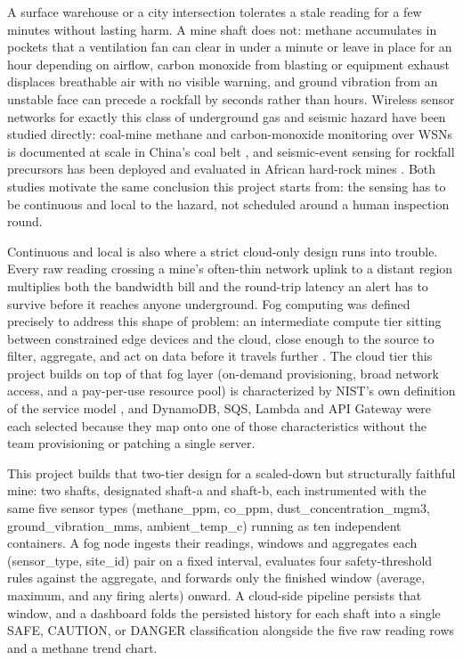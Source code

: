 \documentclass[conference]{IEEEtran}
\begin{document}
A surface warehouse or a city intersection tolerates a stale reading for a few minutes without lasting harm. A mine shaft does not: methane accumulates in pockets that a ventilation fan can clear in under a minute or leave in place for an hour depending on airflow, carbon monoxide from blasting or equipment exhaust displaces breathable air with no visible warning, and ground vibration from an unstable face can precede a rockfall by seconds rather than hours. Wireless sensor networks for exactly this class of underground gas and seismic hazard have been studied directly: coal-mine methane and carbon-monoxide monitoring over WSNs is documented at scale in China's coal belt \cite{ref1}, and seismic-event sensing for rockfall precursors has been deployed and evaluated in African hard-rock mines \cite{ref2}. Both studies motivate the same conclusion this project starts from: the sensing has to be continuous and local to the hazard, not scheduled around a human inspection round.

Continuous and local is also where a strict cloud-only design runs into trouble. Every raw reading crossing a mine's often-thin network uplink to a distant region multiplies both the bandwidth bill and the round-trip latency an alert has to survive before it reaches anyone underground. Fog computing was defined precisely to address this shape of problem: an intermediate compute tier sitting between constrained edge devices and the cloud, close enough to the source to filter, aggregate, and act on data before it travels further \cite{ref3}. The cloud tier this project builds on top of that fog layer (on-demand provisioning, broad network access, and a pay-per-use resource pool) is characterized by NIST's own definition of the service model \cite{ref4}, and DynamoDB, SQS, Lambda and API Gateway were each selected because they map onto one of those characteristics without the team provisioning or patching a single server.

This project builds that two-tier design for a scaled-down but structurally faithful mine: two shafts, designated shaft-a and shaft-b, each instrumented with the same five sensor types (methane\_ppm, co\_ppm, dust\_concentration\_mgm3, ground\_vibration\_mms, ambient\_temp\_c) running as ten independent containers. A fog node ingests their readings, windows and aggregates each (sensor\_type, site\_id) pair on a fixed interval, evaluates four safety-threshold rules against the aggregate, and forwards only the finished window (average, maximum, and any firing alerts) onward. A cloud-side pipeline persists that window, and a dashboard folds the persisted history for each shaft into a single SAFE, CAUTION, or DANGER classification alongside the five raw reading rows and a methane trend chart.
\end{document}
